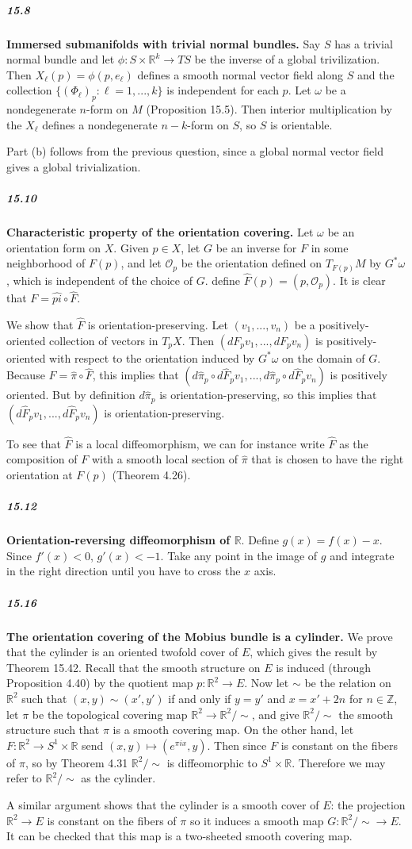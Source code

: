 \documentclass[10pt,letter]{article}
\begin{document}
\subparagraph*{15.8} {\bf Immersed submanifolds with trivial normal bundles.} Say $S$ has a trivial normal bundle and let $\phi:  S \times \mathbb{R}^k \rightarrow TS$ be the inverse of a global trivilization. Then $X_\ell(p) = \phi(p,e_\ell)$ defines a smooth normal vector field along $S$ and the collection $\lbrace (\Phi_\ell)_p: \ell = 1,...,k \rbrace$ is independent for each $p$. Let $\omega$ be a nondegenerate $n$-form on $M$ (Proposition 15.5). Then interior multiplication by the $X_\ell$ defines a nondegenerate $n-k$-form on $S$, so $S$ is orientable.

Part (b) follows from the previous question, since a global normal vector field gives a global trivialization.

\subparagraph*{15.10} {\bf Characteristic property of the orientation covering.} Let $\omega$ be an orientation form on $X$. Given $p \in X$, let $G$ be an inverse for $F$ in some neighborhood of $F(p)$, and let $\mathcal{O}_p$ be the orientation defined on $T_{F(p)}M$ by $G^{\ast}\omega$, which is independent of the choice of $G$. define $\hat{F}(p) = (p,\mathcal{O}_p)$. It is clear that $F = \hat{pi} \circ \hat{F}$. 

We show that $\hat{F}$ is orientation-preserving. Let $(v_1,...,v_n)$ be a positively-oriented collection of vectors in $T_pX$. Then $(dF_pv_1,...,dF_pv_n)$ is positively-oriented with respect to the orientation induced by $G^{\ast}\omega$ on the domain of $G$. Because $F = \hat{\pi} \circ \hat{F}$, this implies that $(d\hat{\pi}_p \circ d\hat{F}_p v_1,...,d\hat{\pi}_p \circ d\hat{F}_p v_n)$ is positively oriented. But by definition $d\hat{\pi}_p$ is orientation-preserving, so this implies that $(d\hat{F}_p v_1,...,d\hat{F}_p v_n)$ is orientation-preserving.

To see that $\hat{F}$ is a local diffeomorphism, we can for instance write $\hat{F}$ as the composition of $F$ with a smooth local section of $\hat{\pi}$ that is chosen to have the right orientation at $F(p)$ (Theorem 4.26). 

\subparagraph*{15.12} {\bf Orientation-reversing diffeomorphism of $\mathbb{R}$}. Define $g(x) = f(x) - x$. Since $f'(x) < 0$, $g'(x) < -1$. Take any point in the image of $g$ and integrate in the right direction until you have to cross the $x$ axis.
 
\subparagraph*{15.16} {\bf The orientation covering of the Mobius bundle is a cylinder.} We prove that the cylinder is an oriented twofold cover of $E$, which gives the result by Theorem 15.42. Recall that the smooth structure on $E$ is induced (through Proposition 4.40) by the quotient map $p: \mathbb{R}^2 \rightarrow E$. Now let $\sim$ be the relation on $\mathbb{R}^2$ such that $(x,y) \sim (x',y')$ if and only if $y = y'$ and $x = x' + 2n$ for $n \in \mathbb{Z}$, let $\pi$ be the topological covering map $\mathbb{R}^2 \rightarrow \mathbb{R}^2/\sim$, and give $\mathbb{R}^2/\sim$ the smooth structure such that $\pi$ is a smooth covering map. On the other hand, let $F: \mathbb{R}^2 \rightarrow S^1 \times \mathbb{R}$ send $(x,y) \mapsto (e^{\pi i x},y)$. Then since $F$ is constant on the fibers of $\pi$, so by Theorem 4.31 $\mathbb{R}^2/\sim$ is diffeomorphic to $S^1 \times \mathbb{R}$. Therefore we may refer to $\mathbb{R}^2/\sim$ as the cylinder.

A similar argument shows that the cylinder is a smooth cover of $E$: the projection $\mathbb{R}^2 \rightarrow E$ is constant on the fibers of $\pi$ so it induces a smooth map $G: \mathbb{R}^2/\sim \rightarrow E$. It can be checked that this map is a two-sheeted smooth covering map. 
 
\end{document}
